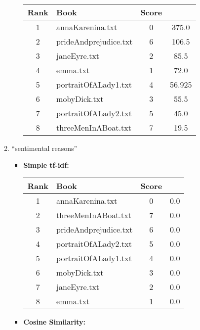 \documentclass[a4paper,11pt,oneside]{book}
\begin{document}
\begin{enumerate}
\begin{enumerate}
\begin{itemize}
										\begin{tabular}{clcc}
											\toprule
												\textbf{Rank} & \textbf{Book} & \textbf{Score}\\
											\hline
												1	&	annaKarenina.txt	&	0	&	375.0	\\
												2	&	prideAndprejudice.txt	&	6	&	106.5	\\
												3	&	janeEyre.txt	&	2	&	85.5	\\
												4	&	emma.txt	&	1	&	72.0	\\
												5	&	portraitOfALady1.txt	&	4	&	56.925	\\
												6	&	mobyDick.txt	&	3	&	55.5	\\
												7	&	portraitOfALady2.txt	&	5	&	45.0	\\
												8	&	threeMenInABoat.txt	&	7	&	19.5	\\
											\bottomrule
										\end{tabular}\newline
						\end{itemize}
						
			\item ``sentimental reasons''
						\begin{itemize}
							\item \textbf{Simple tf-idf:}
							
										\begin{tabular}{clcc}
											\toprule
												\textbf{Rank} & \textbf{Book} & \textbf{Score}\\
											\hline
												1	&	annaKarenina.txt	&	0	&	0.0	\\
												2	&	threeMenInABoat.txt	&	7	&	0.0	\\
												3	&	prideAndprejudice.txt	&	6	&	0.0	\\
												4	&	portraitOfALady2.txt	&	5	&	0.0	\\
												5	&	portraitOfALady1.txt	&	4	&	0.0	\\
												6	&	mobyDick.txt	&	3	&	0.0	\\
												7	&	janeEyre.txt	&	2	&	0.0	\\
												8	&	emma.txt	&	1	&	0.0	\\
											\bottomrule
										\end{tabular}\newline
							\item \textbf{Cosine Similarity:}
							

\end{itemize}
\end{enumerate}
\end{enumerate}
\end{document}
